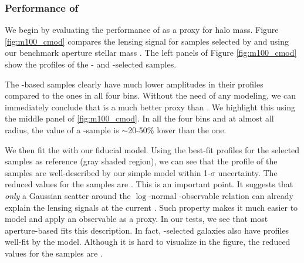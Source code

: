 \documentclass[a4paper,fleqn,usenatbib]{mnras}
\begin{document}
\subsubsection{Performance of \mcmodel{}}
    \label{sec:cmodel}


    We begin by evaluating the performance of \cmodel{} as a proxy for halo mass. 
    Figure \ref{fig:m100_cmod} compares the lensing signal for samples selected by \mcmodel{} and
    using our benchmark aperture stellar mass .
    The left panels of Figure \ref{fig:m100_cmod} show the \rdsigma{} profiles of the \mcmodel{}-
    and -selected samples.
            
    The \mcmodel{}-based samples clearly have much lower amplitudes in their \dsigma{} profiles
    compared to the  ones in all four bins.
    Without the need of any modeling, we can immediately conclude that  is a much
    better \mvir{} proxy than \mcmodel{}.
    We highlight this using the middle panel of \ref{fig:m100_cmod}.            
    In all the four bins and at almost all radius, the \dsigma{} value of a \mcmodel{}-sample
    is $\sim$20-50\% lower than the  one.
            
    We then fit the \dsigma{} with our fiducial model.  
    Using the best-fit profiles for the  selected samples as reference (gray shaded
    region), we can see that the \dsigma{} profile of the  samples are well-described
    by our simple model within 1-$\sigma$ uncertainty. The reduced \chisq{} values for the
    \maper{} samples are \todo{[XX, XX, XX, XX]}.
    This is an important point. It suggests that \emph{only} a Gaussian scatter around the
    $\log$-normal \mvir{}-observable relation can already explain the lensing signals at the
    current \snratio{}.
    Such property makes it much easier to model and apply an observable as a \mvir{} proxy.
    In our tests, we see that most aperture-based \mstar{} fits this description.
    In fact, \cmodel{}-selected galaxies also have \dsigma{} profiles well-fit by the model.
    Although it is hard to visualize in the figure, the reduced \chisq{} values for the
    \mcmodel{} samples are \todo{[XX, XX, XX, XX]}.
\end{document}
